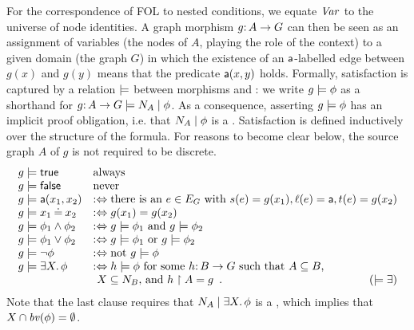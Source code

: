 For the correspondence of FOL to nested conditions, we equate $\mathit{Var}$ to the universe of node identities. A graph morphism $g{:}\, A\rightarrow G$ can then be seen as an assignment of variables (the nodes of $A$, playing the role of the context) to a given domain (the graph $G$) in which the existence of an $\mathsf{a}$-labelled edge between $g(x)$ and $g(y)$ means that the predicate $\mathsf{a}(x,y)$ holds. Formally, satisfaction is captured by a relation $\models$ between morphisms and \cfors: we write $g \models \phi$ as a shorthand for $g {:}\, A \rightarrow G \models {N_A} \mid {\phi}$. As a consequence, asserting $g \models \phi$ has an implicit proof obligation, i.e. that ${N_A} \mid {\phi}$ is a {\cfor}.  Satisfaction is defined inductively over the structure of the formula.
For reasons to become clear below, the source graph $A$ of $g$ is not required to be discrete.
%
\[\begin{array}{ll}
g\sat \True & \text{always} \\
g\sat \False & \text{never} \\
g\sat \la(x_1,x_2) & \iffdef \text{there is an } e\in E_G \text{ with } s(e)=g(x_1), \ell(e)=\la, t(e)=g(x_2) \\
g\sat x_1\Eq x_2 & \iffdef g(x_1)=g(x_2) \\
g\sat \phi_1\wedge \phi_2 & \iffdef g\sat \phi_1 \text{ and } g\sat \phi_2 \\
g\sat \phi_1\vee \phi_2 & \iffdef g\sat \phi_1 \text{ or } g\sat \phi_2 \\
g\sat \neg\phi & \iffdef \text{not } g\sat \phi \\
g\sat \exists X\st \phi  & \iffdef h\sat \phi \text{ for some $h\of B \to G$ such that $A \subseteq B$,}\\
& \text{ $X \subseteq N_B$, and }  h\restr A = g\enspace.\hfill (\sat\exists)
\end{array}\]
%
Note that the last clause requires that ${N_A} \mid {\exists X.\,\phi}$ is a {\cfor}, which implies that $X \cap \mathit{bv}(\phi) = \emptyset$.

